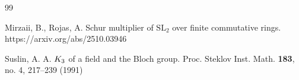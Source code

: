 \documentclass[11pt]{amsart}
\theoremstyle{definition}
\theoremstyle{plain}
\numberwithin{equation}{section}
\newcommand{\SL}{\mathit{{\rm SL}}}
\begin{document}
\begin{thebibliography}{99}
 

Mirzaii, B., Rojas, A. Schur multiplier of $\mathrm{SL}_2$ over finite commutative rings. https://arxiv.org/abs/2510.03946

Suslin, A. A. $K\sb 3$ of a field and the Bloch group. Proc. Steklov Inst. Math. {\bf 183}, no. 4, 217--239 (1991)







\end{thebibliography}
	
\end{document}
